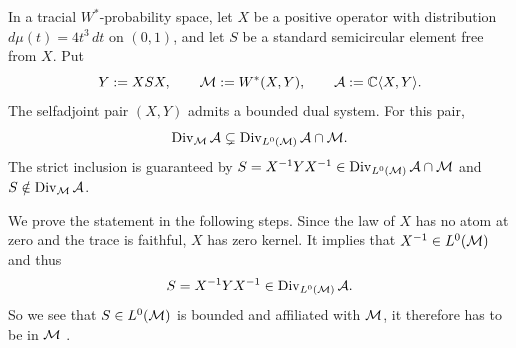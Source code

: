 \begin{example}\label{ex:bounded-division-closure}
In a tracial $W^*$-probability space, let $X$ be a positive operator with distribution $d\mu(t)=4t^3\,dt$ on $(0,1)$, and let $S$ be a standard semicircular element free from $X$.
Put
\[
 Y:=XSX,\qquad \mathcal M:=W^*(X,Y),\qquad \mathcal A:=\mathbb C\langle X,Y\rangle.
\]
The selfadjoint pair $(X,Y)$ admits a bounded dual system.
For this pair,
\[
 \operatorname{Div}_{\mathcal M}\mathcal A
 \subsetneq \operatorname{Div}_{L^0(\mathcal M)}\mathcal A\cap\mathcal M.
\]
The strict inclusion is guaranteed by $S=X^{-1}YX^{-1}\in\operatorname{Div}_{L^0(\mathcal M)}\mathcal A\cap\mathcal M$ and $S\notin\operatorname{Div}_{\mathcal M}\mathcal A$.

We prove the statement in the following steps.
Since the law of $X$ has no atom at zero and the trace is faithful, $X$ has zero kernel.
It implies that $X^{-1}\in L^0(\mathcal M)$ and thus
\[
 S=X^{-1}YX^{-1}\in\operatorname{Div}_{L^0(\mathcal M)}\mathcal A.
\]
So we see that $S\in L^0(\mathcal M)$ is bounded and affiliated with $\mathcal M$, it therefore has to be in $\mathcal M$ \cite[Proposition~7.2.3]{AP18}.


\end{example}
